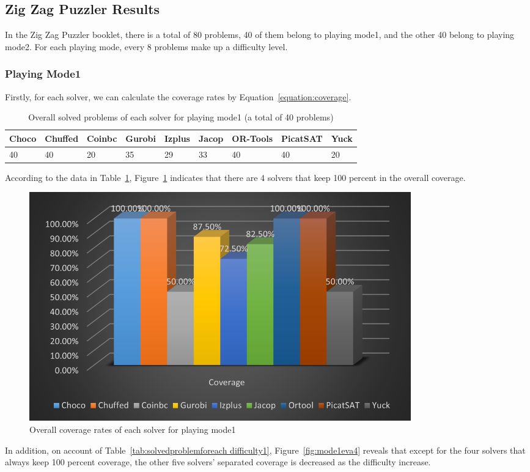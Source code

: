 \subsection{Zig Zag Puzzler Results}
\label{sec:Zig Zag Puzzlerresult}
In the Zig Zag Puzzler booklet, there is a total of 80 problems, 40 of them belong to playing mode1, and the other 40 belong to playing mode2. For each playing mode, every 8 problems make up a difficulty level. 
\subsubsection{Playing Mode1}
Firstly, for each solver, we can calculate the coverage rates by Equation~\ref{equation:coverage}.
\begin{table}[htbp]
\centering
\caption{Overall solved problems of each solver for playing mode1 (a total of 40 problems)}
\label{tab:solvedproblem1}
\begin{tabular}{|l|l|l|l|l|l|l|l|l|}
\hline
Choco & Chuffed & Coinbc& Gurobi & Izplus&Jacop& OR-Tools& PicatSAT&Yuck \\
\hline
40   &40      & 20    & 35    &29     &33   &40    &40      &20\\
\hline
\end{tabular}
\end{table}
According to the data in Table~\ref{tab:solvedproblem1}, Figure~\ref{fig:mode1eva2} indicates that there are 4 solvers that keep 100 percent in the overall coverage.
\begin{figure}[H]
     \centering
    \includegraphics[width=0.8\textwidth]{figs/mode1coverage.png}
    \caption{Overall coverage rates of each solver for playing mode1}
    \label{fig:mode1eva2}
\end{figure}
In addition, on account of Table~\ref{tab:solvedproblemforeach difficulty1}, Figure~\ref{fig:mode1eva4} reveals that except for the four solvers that always keep 100 percent coverage, the other five solvers' separated coverage is decreased as the difficulty increase.
